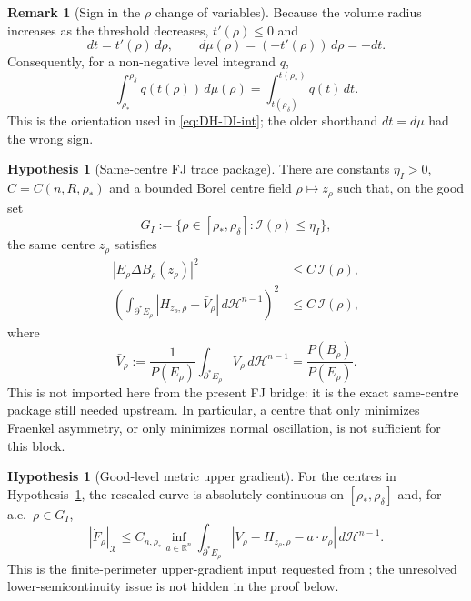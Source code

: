 \documentclass[11pt]{article}
\theoremstyle{definition}
\newtheorem{remark}[theorem]{Remark}
\newtheorem{hypothesis}[theorem]{Hypothesis}
\newcommand{\R}{\mathbb{R}}
\newcommand{\rstar}{\rho_{*}}
\newcommand{\X}{\mathcal X}
\begin{document}
\begin{remark}[Sign in the $\rho$ change of variables]\label{rem:sign}
Because the volume radius increases as the threshold decreases,
$t'(\rho)\le0$ and
\[
   dt=t'(\rho)\,d\rho,\qquad d\mu(\rho)=(-t'(\rho))\,d\rho=-dt.
\]
Consequently, for a non-negative level integrand $q$,
\[
   \int_{\rstar}^{\rho_\delta}q(t(\rho))\,d\mu(\rho)
   =\int_{t(\rho_\delta)}^{t(\rstar)}q(t)\,dt.
\]
This is the orientation used in \eqref{eq:DH-DI-int}; the older shorthand
$dt=d\mu$ had the wrong sign.
\end{remark}

\begin{hypothesis}[Same-centre FJ trace package]\label{hyp:FJ-trace}
There are constants $\eta_I>0$, $C=C(n,R,\rstar)$ and a bounded Borel centre
field $\rho\mapsto z_\rho$ such that, on the good set
\[
   G_I:=\{\rho\in[\rstar,\rho_\delta]:\mathcal I(\rho)\le\eta_I\},
\]
the same centre $z_\rho$ satisfies
\begin{align}
   |E_\rho\Delta B_\rho(z_\rho)|^2
      &\le C\,\mathcal I(\rho),\label{eq:FJ-asym}\\
   \left(\int_{\partial^*E_\rho}|H_{z_\rho,\rho}-\bar V_\rho|\,
       d\mathcal H^{n-1}\right)^2
      &\le C\,\mathcal I(\rho),\label{eq:htrace-good}
\end{align}
where
\[
   \bar V_\rho:=\frac{1}{P(E_\rho)}
       \int_{\partial^*E_\rho}V_\rho\,d\mathcal H^{n-1}
       =\frac{P(B_\rho)}{P(E_\rho)}.
\]
This is not imported here from the present FJ bridge: it is the exact
same-centre package still needed upstream.  In particular, a centre that
only minimizes Fraenkel asymmetry, or only minimizes normal oscillation,
is not sufficient for this block.
\end{hypothesis}

\begin{hypothesis}[Good-level metric upper gradient]\label{hyp:metric-good}
For the centres in Hypothesis~\ref{hyp:FJ-trace}, the rescaled curve is
absolutely continuous on $[\rstar,\rho_\delta]$ and, for a.e.\
$\rho\in G_I$,
\[
   |\dot F_\rho|_\X\le C_{n,\rstar}\inf_{a\in\R^n}
   \int_{\partial^*E_\rho}|V_\rho-H_{z_\rho,\rho}-a\cdot\nu_\rho|\,
     d\mathcal H^{n-1}.
\]
This is the finite-perimeter upper-gradient input requested from
\cite{MetricFramework}; the unresolved lower-semicontinuity issue is not
hidden in the proof below.
\end{hypothesis}
\end{document}
